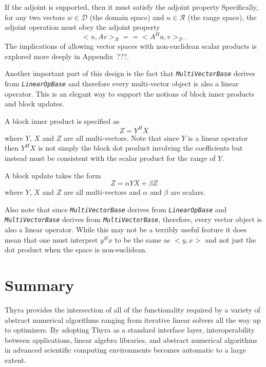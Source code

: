 \documentclass[pdf,ps2pdf,11pt]{SANDreport}
\begin{document}
If the adjoint is supported, then it must satisfy the adjoint property
Specifically, for any two vectors $w\in\mathcal{D}$ (the domain space) and
$u\in\mathcal{R}$ (the range space), the adjoint operation must obey the
adjoint property
\[
  <u,A v>_{\mathcal{R}} =\!= <A^H u, v>_{\mathcal{D}}.
\]
The implications of allowing vector spaces with non-euclidean scalar products
is explored more deeply in Appendix~???.

Another important part of this design is the fact that
{}\texttt{\textit{Multi\-Vector\-Base}} derives from
{}\texttt{\textit{Linear\-Op\-Base}} and therefore every multi-vector object
is also a linear operator.  This is an elegant way to support the notions of
block inner products and block updates.

A block inner product is specified as
\[
Z = Y^H X
\]
where $Y$, $X$ and $Z$ are all multi-vectors.  Note that since $Y$ is a linear
operator then $Y^H X$ is not simply the block dot product involving the
coefficients but instead must be consistent with the scalar product for the
range of $Y$.

A block update takes the form
\[
Z =\alpha Y X + \beta Z
\]
where $Y$, $X$ and $Z$ are all multi-vectors and $\alpha$ and $\beta$ are
scalars.

Also note that since {}\texttt{\textit{Multi\-Vector\-Base}} derives from
{}\texttt{\textit{Linear\-Op\-Base}} and
{}\texttt{\textit{Multi\-Vector\-Base}} derives from
{}\texttt{\textit{Multi\-Vector\-Base}}, therefore, every vector object is
also a linear operator.  While this may not be a terribly useful feature it
does mean that one must interpret $y^H x$ to be the same as $<y,x>$ and not
just the dot product when the space is non-euclidean.

%
\section{Summary}
%

Thyra provides the intersection of all of the functionality required by a
variety of abstract numerical algorithms ranging from iterative linear solvers
all the way up to optimizers.  By adopting Thyra as a standard interface
layer, interoperability between applications, linear algebra libraries, and
abstract numerical algorithms in advanced scientific computing environments
becomes automatic to a large extent.

%
\clearpage



%
\appendix
%


\end{document}
